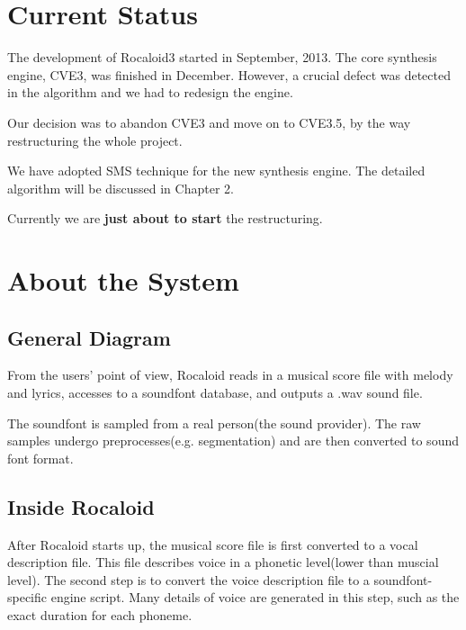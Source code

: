 \section{Current Status}\indent

        The development of Rocaloid3 started in September, 2013. The core synthesis engine, CVE3, was finished in December. However, a crucial defect was detected in the algorithm and we had to redesign the engine.
        
        Our decision was to abandon CVE3 and move on to CVE3.5, by the way restructuring the whole project.
        
        We have adopted SMS technique for the new synthesis engine. The detailed algorithm will be discussed in Chapter 2.
        
        Currently we are \textbf{just about to start} the restructuring.

\section{About the System}

\subsection{General Diagram}\indent

        From the users' point of view, Rocaloid reads in a musical score file with melody and lyrics, accesses to a soundfont database, and outputs a .wav sound file.

        The soundfont is sampled from a real person(the sound provider). The raw samples undergo preprocesses(e.g. segmentation) and are then converted to sound font format.
        
        \newpage

\subsection{Inside Rocaloid}\indent

        After Rocaloid starts up, the musical score file is first converted to a vocal description file. This file describes voice in a phonetic level(lower than muscial level). The second step is to convert the voice description file to a soundfont-specific engine script. Many details of voice are generated in this step, such as the exact duration for each phoneme.
        
